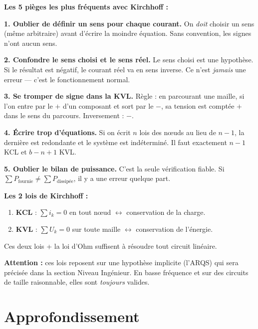 \documentclass[12pt,a4paper,twoside]{book}
\begin{document}
\begin{attention}
\textbf{Les 5 pièges les plus fréquents avec Kirchhoff :}

\textbf{1. Oublier de définir un sens pour chaque courant.} On \textit{doit} choisir un sens (même arbitraire) avant d'écrire la moindre équation. Sans convention, les signes n'ont aucun sens.

\textbf{2. Confondre le sens choisi et le sens réel.} Le sens choisi est une hypothèse. Si le résultat est négatif, le courant réel va en sens inverse. Ce n'est \textit{jamais} une erreur --- c'est le fonctionnement normal.

\textbf{3. Se tromper de signe dans la KVL.} Règle : en parcourant une maille, si l'on entre par le $+$ d'un composant et sort par le $-$, sa tension est comptée $+$ dans le sens du parcours. Inversement : $-$.

\textbf{4. Écrire trop d'équations.} Si on écrit $n$ lois des n\oe uds au lieu de $n-1$, la dernière est redondante et le système est indéterminé. Il faut exactement $n-1$ KCL et $b-n+1$ KVL.

\textbf{5. Oublier le bilan de puissance.} C'est la seule vérification fiable. Si $\sum P_{\text{fournie}} \neq \sum P_{\text{dissipée}}$, il y a une erreur quelque part.
\end{attention}

\begin{retenir}
\textbf{Les 2 lois de Kirchhoff :}
\begin{enumerate}[nosep]
\item \textbf{KCL} : $\sum i_k = 0$ en tout n\oe ud $\longleftrightarrow$ conservation de la charge.
\item \textbf{KVL} : $\sum U_k = 0$ sur toute maille $\longleftrightarrow$ conservation de l'énergie.
\end{enumerate}
Ces deux lois + la loi d'Ohm suffisent à résoudre tout circuit linéaire.

\textbf{Attention :} ces lois reposent sur une hypothèse implicite (l'ARQS) qui sera précisée dans la section Niveau Ingénieur. En basse fréquence et sur des circuits de taille raisonnable, elles sont \textit{toujours} valides.
\end{retenir}

\section{Approfondissement}
\end{document}
